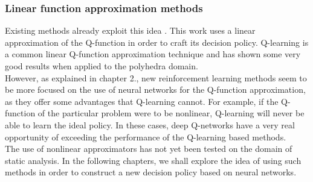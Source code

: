 \subsubsection{Linear function approximation methods}

Existing methods already exploit this idea \cite{singh2018fast}. This work uses a linear approximation of the Q-function in order to craft its decision policy. Q-learning is a common linear Q-function approximation technique and has shown some very good results when applied to the polyhedra domain.\\
However, as explained in chapter 2., new reinforcement learning methods seem to be more focused on the use of neural networks for the Q-function approximation, as they offer some advantages that Q-learning cannot. For example, if the Q-function of the particular problem were to be nonlinear, Q-learning will never be able to learn the ideal policy. In these cases, deep Q-networks have a very real opportunity of exceeding the performance of the Q-learning based methods.\\
The use of nonlinear approximators has not yet been tested on the domain of static analysis. In the following chapters, we shall explore the idea of using such methods in order to construct a new decision policy based on neural networks.
















